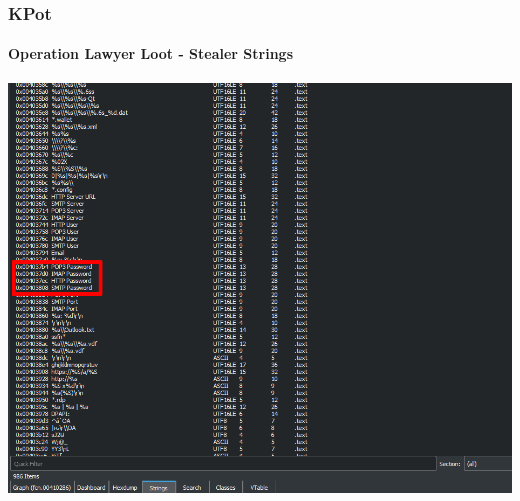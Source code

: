 \documentclass[aspectratio=169]{beamer}
\begin{document}
{
\begin{frame}
  \frametitle{KPot}
  \framesubtitle{Operation Lawyer Loot - Stealer Strings}
  \begin{center}
    \includegraphics[scale=0.95]{kpot-unpacking-12}
  \end{center}
\end{frame}
}
\end{document}
